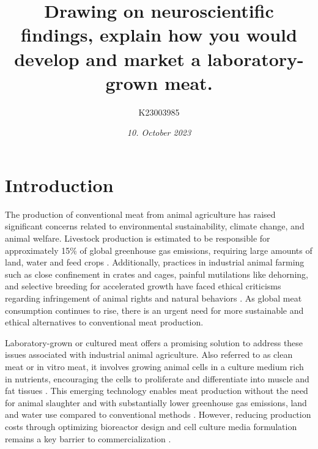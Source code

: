 \documentclass[10pt]{article}
\title{Drawing on neuroscientific findings, explain how you would develop and market a laboratory-grown meat.}
\author[ ]{K23003985}
\date{\textit{10. October 2023}}
\begin{document}

\maketitle


\begin{sloppypar} %





  \section{Introduction}
  \label{sec:introduction}

  The production of conventional meat from animal agriculture has raised significant concerns related to environmental sustainability, climate change, and animal welfare. Livestock production is estimated to be responsible for approximately 15\% of global greenhouse gas emissions, requiring large amounts of land, water and feed crops \citep{tuomisto_environmental_2011}. Additionally, practices in industrial animal farming such as close confinement in crates and cages, painful mutilations like dehorning, and selective breeding for accelerated growth have faced ethical criticisms regarding infringement of animal rights and natural behaviors \citep{stephens_bringing_2018}. As global meat consumption continues to rise, there is an urgent need for more sustainable and ethical alternatives to conventional meat production.

  Laboratory-grown or cultured meat offers a promising solution to address these issues associated with industrial animal agriculture. Also referred to as clean meat or in vitro meat, it involves growing animal cells in a culture medium rich in nutrients, encouraging the cells to proliferate and differentiate into muscle and fat tissues \citep{datar_possibilities_2010}. This emerging technology enables meat production without the need for animal slaughter and with substantially lower greenhouse gas emissions, land and water use compared to conventional methods \citep{tuomisto_environmental_2011}. However, reducing production costs through optimizing bioreactor design and cell culture media formulation remains a key barrier to commercialization \citep{specht_opportunities_2018}.


\end{sloppypar}
\end{document}
